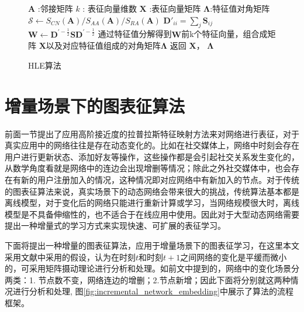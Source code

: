 \begin{figure}[htb]
	\centering
	\begin{minipage}{.7\linewidth}
		\begin{algorithm}[H]
			\small
			\caption{HLE算法}
			\begin{algorithmic}[1]
				\Require
				\Statex $\textbf{A}$ :邻接矩阵
				\Statex $k$ : 表征向量维数
				\Ensure
				\Statex $\textbf{X}$ :表征向量矩阵
				\Statex $\bm{\Lambda}$:特征值对角矩阵
				\Statex
				\State $\mathcal{S} \leftarrow S_{CN}(\textbf{A}) /S_{AA}(\textbf{A}) / S_{RA}(\textbf{A})$
				\State $\textbf{D}'_{ii} = \sum_j \textbf{S}_{ij}$
				\State $\textbf{W} \leftarrow  \textbf{D}^{\prime-\frac{1}{2}}\textbf{SD}^{\prime-\frac{1}{2}}$
				\State 通过特征值分解得到$\textbf{W}$前k个特征向量，组合成矩阵 $\textbf{X}$以及对应特征值组成的对角矩阵$\bm{\Lambda}$
				\State 返回 $\textbf{X}$， $\bm{\Lambda}$
			\end{algorithmic}
		\end{algorithm}
	\end{minipage}
\end{figure}
\section{增量场景下的图表征算法}
前面一节提出了应用高阶接近度的拉普拉斯特征映射方法来对网络进行表征，对于真实应用中的网络往往是存在动态变化的。比如在社交媒体上，网络中时刻会存在用户进行更新状态、添加好友等操作，这些操作都是会引起社交关系发生变化的，从数学角度看就是网络中的连边会出现增删等情况；除此之外社交媒体中，也会存在有新的用户注册加入的情况，这种情况即对应网络中有新加入的节点。对于传统的图表征算法来说，真实场景下的动态网络会带来很大的挑战，传统算法基本都是离线模型，对于变化后的网络只能进行重新计算或学习，当网络规模很大时，离线模型是不具备伸缩性的，也不适合于在线应用中使用。因此对于大型动态网络需要提出一种增量式的学习方式来实现快速、可扩展的表征学习。

下面将提出一种增量的图表征算法，应用于增量场景下的图表征学习，在这里本文采用文献\cite{chi2007evolutionary}中采用的假设，认为在时刻$t$和时刻$t+1$之间网络的变化是平缓而微小的，可采用矩阵摄动理论\cite{stewart1990matrix, asucheetah}进行分析和处理。如前文中提到的，网络中的变化场景分两类：1. 节点数不变，网络连边的增删；2.节点新增；因此下面将分别就这两种情况进行分析和处理,
图\ref{fig:incremental_network_embedding}中展示了算法的流程框架。

